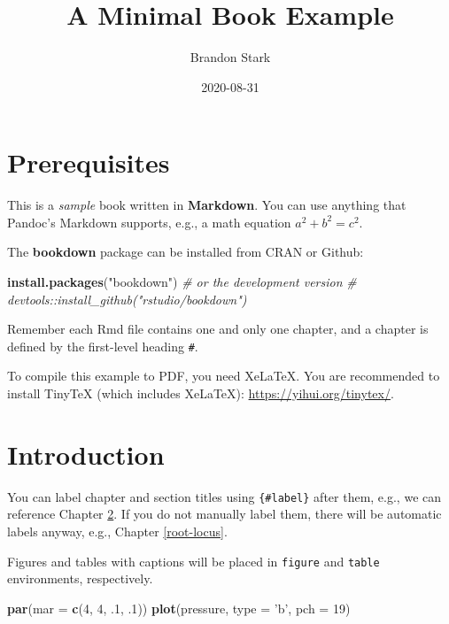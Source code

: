 \documentclass[
]{book}
\title{A Minimal Book Example}
\author{Brandon Stark}
\date{2020-08-31}
\newenvironment{Shaded}{\begin{snugshade}}{\end{snugshade}}
\newcommand{\CommentTok}[1]{\textcolor[rgb]{0.56,0.35,0.01}{\textit{#1}}}
\newcommand{\DataTypeTok}[1]{\textcolor[rgb]{0.13,0.29,0.53}{#1}}
\newcommand{\DecValTok}[1]{\textcolor[rgb]{0.00,0.00,0.81}{#1}}
\newcommand{\FloatTok}[1]{\textcolor[rgb]{0.00,0.00,0.81}{#1}}
\newcommand{\KeywordTok}[1]{\textcolor[rgb]{0.13,0.29,0.53}{\textbf{#1}}}
\newcommand{\NormalTok}[1]{#1}
\newcommand{\StringTok}[1]{\textcolor[rgb]{0.31,0.60,0.02}{#1}}
\theoremstyle{definition}
\theoremstyle{definition}
\theoremstyle{definition}
\theoremstyle{remark}
\begin{document}
\maketitle

{
\setcounter{tocdepth}{1}
\tableofcontents
}
\hypertarget{prerequisites}{%
\chapter{Prerequisites}\label{prerequisites}}

This is a \emph{sample} book written in \textbf{Markdown}. You can use anything that Pandoc's Markdown supports, e.g., a math equation \(a^2 + b^2 = c^2\).

The \textbf{bookdown} package can be installed from CRAN or Github:

\begin{Shaded}
\begin{Highlighting}[]
\KeywordTok{install.packages}\NormalTok{(}\StringTok{"bookdown"}\NormalTok{)}
\CommentTok{# or the development version}
\CommentTok{# devtools::install_github("rstudio/bookdown")}
\end{Highlighting}
\end{Shaded}

Remember each Rmd file contains one and only one chapter, and a chapter is defined by the first-level heading \texttt{\#}.

To compile this example to PDF, you need XeLaTeX. You are recommended to install TinyTeX (which includes XeLaTeX): \url{https://yihui.org/tinytex/}.

\hypertarget{intro}{%
\chapter{Introduction}\label{intro}}

You can label chapter and section titles using \texttt{\{\#label\}} after them, e.g., we can reference Chapter \ref{intro}. If you do not manually label them, there will be automatic labels anyway, e.g., Chapter \ref{root-locus}.

Figures and tables with captions will be placed in \texttt{figure} and \texttt{table} environments, respectively.

\begin{Shaded}
\begin{Highlighting}[]
\KeywordTok{par}\NormalTok{(}\DataTypeTok{mar =} \KeywordTok{c}\NormalTok{(}\DecValTok{4}\NormalTok{, }\DecValTok{4}\NormalTok{, }\FloatTok{.1}\NormalTok{, }\FloatTok{.1}\NormalTok{))}
\KeywordTok{plot}\NormalTok{(pressure, }\DataTypeTok{type =} \StringTok{'b'}\NormalTok{, }\DataTypeTok{pch =} \DecValTok{19}\NormalTok{)}
\end{Highlighting}
\end{Shaded}
\end{document}
